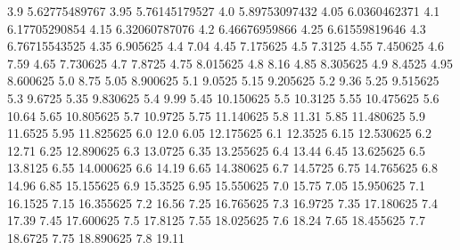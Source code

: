             3.9    5.62775489767
           3.95    5.76145179527
            4.0    5.89753097432
           4.05     6.0360462371
            4.1    6.17705290854
           4.15    6.32060787076
            4.2    6.46676959866
           4.25    6.61559819646
            4.3    6.76715543525
           4.35         6.905625
            4.4             7.04
           4.45         7.175625
            4.5           7.3125
           4.55         7.450625
            4.6             7.59
           4.65         7.730625
            4.7           7.8725
           4.75         8.015625
            4.8             8.16
           4.85         8.305625
            4.9           8.4525
           4.95         8.600625
            5.0             8.75
           5.05         8.900625
            5.1           9.0525
           5.15         9.205625
            5.2             9.36
           5.25         9.515625
            5.3           9.6725
           5.35         9.830625
            5.4             9.99
           5.45        10.150625
            5.5          10.3125
           5.55        10.475625
            5.6            10.64
           5.65        10.805625
            5.7          10.9725
           5.75        11.140625
            5.8            11.31
           5.85        11.480625
            5.9          11.6525
           5.95        11.825625
            6.0             12.0
           6.05        12.175625
            6.1          12.3525
           6.15        12.530625
            6.2            12.71
           6.25        12.890625
            6.3          13.0725
           6.35        13.255625
            6.4            13.44
           6.45        13.625625
            6.5          13.8125
           6.55        14.000625
            6.6            14.19
           6.65        14.380625
            6.7          14.5725
           6.75        14.765625
            6.8            14.96
           6.85        15.155625
            6.9          15.3525
           6.95        15.550625
            7.0            15.75
           7.05        15.950625
            7.1          16.1525
           7.15        16.355625
            7.2            16.56
           7.25        16.765625
            7.3          16.9725
           7.35        17.180625
            7.4            17.39
           7.45        17.600625
            7.5          17.8125
           7.55        18.025625
            7.6            18.24
           7.65        18.455625
            7.7          18.6725
           7.75        18.890625
            7.8            19.11
